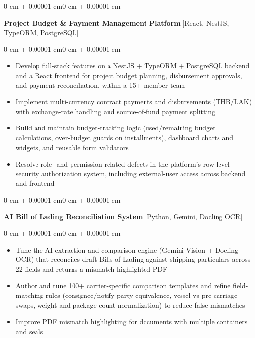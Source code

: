 \documentclass[10pt, letterpaper]{article}
\newenvironment{highlights}{
    \begin{itemize}[
        topsep=0.06 cm,
        parsep=0.06 cm,
        partopsep=0pt,
        itemsep=0pt,
        leftmargin=0.4 cm + 10pt
    ]
}{
    \end{itemize}
}
\newenvironment{onecolentry}{
    \begin{adjustwidth}{0 cm + 0.00001 cm}{0 cm + 0.00001 cm}
}{
    \end{adjustwidth}
}
\begin{document}
        \vspace{0.22 cm}
        \begin{onecolentry}
            \textbf{Project Budget \& Payment Management Platform} [React, NestJS, TypeORM, PostgreSQL]
        \end{onecolentry}

        \vspace{0.10 cm}
        \begin{onecolentry}
            \begin{highlights}
                \item Develop full-stack features on a NestJS + TypeORM + PostgreSQL backend and a React frontend for project budget planning, disbursement approvals, and payment reconciliation, within a 15+ member team
                \item Implement multi-currency contract payments and disbursements (THB/LAK) with exchange-rate handling and source-of-fund payment splitting
                \item Build and maintain budget-tracking logic (used/remaining budget calculations, over-budget guards on installments), dashboard charts and widgets, and reusable form validators
                \item Resolve role- and permission-related defects in the platform's row-level-security authorization system, including external-user access across backend and frontend
            \end{highlights}
        \end{onecolentry}

        \vspace{0.22 cm}
        \begin{onecolentry}
            \textbf{AI Bill of Lading Reconciliation System} [Python, Gemini, Docling OCR]
        \end{onecolentry}

        \vspace{0.10 cm}
        \begin{onecolentry}
            \begin{highlights}
                \item Tune the AI extraction and comparison engine (Gemini Vision + Docling OCR) that reconciles draft Bills of Lading against shipping particulars across 22 fields and returns a mismatch-highlighted PDF
                \item Author and tune 100+ carrier-specific comparison templates and refine field-matching rules (consignee/notify-party equivalence, vessel vs pre-carriage swaps, weight and package-count normalization) to reduce false mismatches
                \item Improve PDF mismatch highlighting for documents with multiple containers and seals
            \end{highlights}
        \end{onecolentry}
\end{document}
